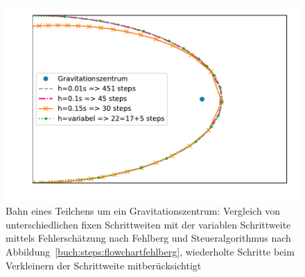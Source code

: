 \begin{figure}
  \centering
  \includegraphics[width=\textwidth]{papers/steps/img/comparison_fehlberg_ssc.pdf}
  \caption{Bahn eines Teilchens um ein Gravitationszentrum: Vergleich von unterschiedlichen fixen Schrittweiten
  mit der variablen Schrittweite mittels Fehlerschätzung nach Fehlberg und Steueralgorithmus nach Abbildung~\ref{buch:steps:flowchartfehlberg},
  wiederholte Schritte beim Verkleinern der Schrittweite mitberücksichtigt}
  \label{buch:steps:comparisonFixedVariableFehlberg}
\end{figure}
